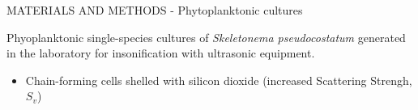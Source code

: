 \documentclass[handout]{beamer}
\newcommand\Fontable{\fontsize{9}{10}\selectfont}
\begin{document}
\begin{frame}{MATERIALS AND METHODS - Phytoplanktonic cultures}
\Fontable

Phyoplanktonic single-species cultures of \textit{Skeletonema pseudocostatum} generated in the laboratory for insonification with ultrasonic equipment.

\begin{minipage}[c]{1\linewidth}
\begin{minipage}[c]{0.7\linewidth}
\begin{itemize}
	\Fontable
	\item<3-> Chain-forming cells shelled with silicon dioxide (increased Scattering Strengh, $S_v$)
\end{itemize}
\end{minipage}
\begin{minipage}[c]{0.29\linewidth}
\end{minipage}
\end{minipage}


\end{frame}
\end{document}
